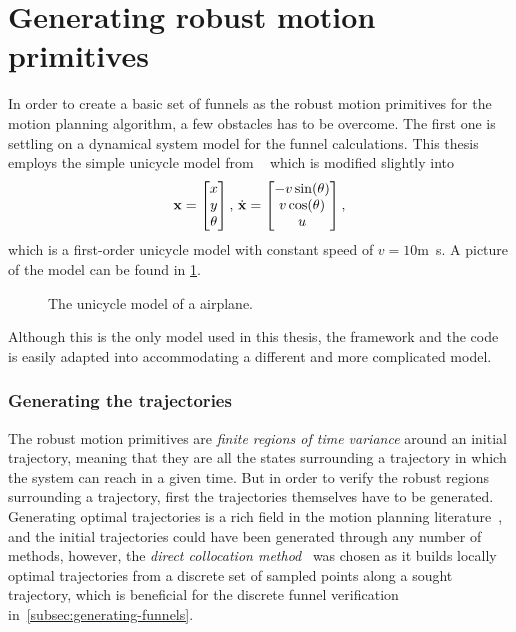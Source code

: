 \section{Generating robust motion primitives}
\label{sec:generating-robust-motion-primitives}

In order to create a basic set of funnels as the robust motion primitives for
the \rrtfunnel{} motion planning algorithm, a few obstacles has to be overcome.
The first one is settling on a dynamical system model for the funnel
calculations. This thesis employs the simple unicycle model from
\citeauthor{Lav06}~\cite[613]{Lav06} which is modified slightly into
\begin{equation}
  \label{eq:model-dynamics}
  \mathsf{\mathbf{x}} =
  \begin{bmatrix}
    x \\ y \\ \theta \\
  \end{bmatrix}, \, \dot{\mathsf{\mathbf{x}}} =
  \begin{bmatrix}
    -v \sin(\theta) \\
    v \cos(\theta) \\
    u \\
  \end{bmatrix},
\end{equation}
which is a first-order unicycle model with constant speed of \(v=10\)\si{m.s}. A
picture of the model can be found in \cref{fig:second-order-unicycle}.
\begin{figure}
  \caption{The unicycle model of a airplane.}
  \label{fig:second-order-unicycle}
\end{figure}
Although this is the only model used in this thesis, the framework and the code
is easily adapted into accommodating a different and more complicated model.

\subsubsection{Generating the trajectories}
\label{subsec:generating-the-trajectories}

The robust motion primitives are \textit{finite regions of time variance} around
an initial trajectory, meaning that they are all the states surrounding a
trajectory in which the system can reach in a given time. But in order to verify
the robust regions surrounding a trajectory, first the trajectories themselves
have to be generated. Generating optimal trajectories is a rich field in the
motion planning literature~\cite{Betts_1998}, and the initial trajectories could
have been generated through any number of methods, however, the \textit{direct
  collocation method}~\cite{von1993numerical} was chosen as it builds locally
optimal trajectories from a discrete set of sampled points along a sought
trajectory, which is beneficial for the discrete funnel verification
in~\cref{subsec:generating-funnels}.

